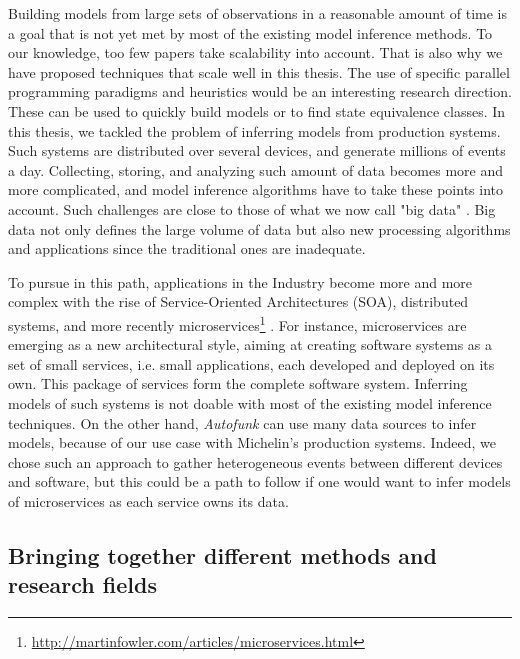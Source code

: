 Building models from large sets of observations in a reasonable
amount of time is a goal that is not yet met by most of the
existing model inference methods. To our knowledge, too few
papers \cite{Yang:2006:PMT:1134285.1134325,Pradel:2009} take
scalability into account. That is also why we have proposed
techniques that scale well in this thesis. The use of specific
parallel programming paradigms and heuristics would be an
interesting research direction. These can be used to quickly
build models or to find state equivalence classes. In this
thesis, we tackled the problem of inferring models from
production systems. Such systems are distributed over several
devices, and generate millions of events a day. Collecting,
storing, and analyzing such amount of data becomes more and more
complicated, and model inference algorithms have to take these
points into account. Such challenges are close to those of what
we now call "big data" \cite{bigdata14}. Big data not only
defines the large volume of data but also new processing
algorithms and applications since the traditional ones are
inadequate.

To pursue in this path, applications in the Industry become more
and more complex with the rise of Service-Oriented Architectures
(SOA), distributed systems, and more recently
microservices\footnote{\url{http://martinfowler.com/articles/microservices.html}}
\cite{thones2015microservices}.  For instance, microservices are
emerging as a new architectural style, aiming at creating
software systems as a set of small services, i.e. small
applications, each developed and deployed on its own. This
package of services form the complete software system. Inferring
models of such systems is not doable with most of the existing
model inference techniques. On the other hand, \textit{Autofunk}
can use many data sources to infer models, because of our use
case with Michelin's production systems. Indeed, we chose such an
approach to gather heterogeneous events between different devices
and software, but this could be a path to follow if one would
want to infer models of microservices as each service owns its
data.

\subsection{Bringing together different methods and research
fields}

